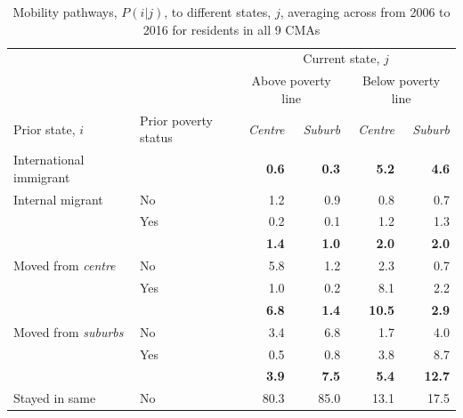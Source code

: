 \begin{table}[h]
	\small
	\centering
	\begin{center}
		
		\caption{{Mobility pathways, $P(i|j)$, to different states, $j$, averaging across from 2006 to 2016 for residents in all 9 CMAs}}
		\label{table:p1}
		\begin{tabular}{llrrrr}
			\hline
			\multicolumn{2}{l}{}                        & \multicolumn{4}{c}{Current state, $j$}                  \\
			\multicolumn{2}{c}{}          & \multicolumn{2}{c}{Above poverty line} & \multicolumn{2}{c}{Below poverty line} \\
			Prior state, $i$                  & Prior poverty status      & \textit{Centre}       & \textit{Suburb}       & \textit{Centre}      & \textit{Suburb}    \\ \hline
			{International immigrant} &  & \textbf{0.6}          & \textbf{0.3}          & \textbf{5.2}         & \textbf{4.6}       \\ \arrayrulecolor{lightgray}\hline
			Internal migrant        & No              & 1.2          & 0.9          & 0.8         & 0.7       \\
			& Yes             & 0.2          & 0.1          & 1.2         & 1.3       \\ 
			\multicolumn{2}{l}{}                        & \textbf{1.4}          & \textbf{1.0}          & \textbf{2.0}         & \textbf{2.0}      \\ \arrayrulecolor{lightgray}\hline
			Moved from \textit{centre}         & No              & 5.8          & 1.2          & 2.3         & 0.7       \\
			& Yes             & 1.0          & 0.2          & 8.1         & 2.2       \\
			\multicolumn{2}{l}{}                        & \textbf{6.8}          & \textbf{1.4}         & \textbf{10.5}       & \textbf{2.9}      \\ \arrayrulecolor{lightgray}\hline
			Moved from \textit{suburbs}        & No              & 3.4          & 6.8          & 1.7         & 4.0       \\
			& Yes             & 0.5          & 0.8          & 3.8         & 8.7       \\
			\multicolumn{2}{l}{}                        & \textbf{3.9}          & \textbf{7.5}          & \textbf{5.4}         & \textbf{12.7}      \\ \arrayrulecolor{lightgray}\hline
			Stayed in same               & No              & 80.3         & 85.0         & 13.1        & 17.5      \\ 

\end{tabular}
\end{center}
\end{table}
